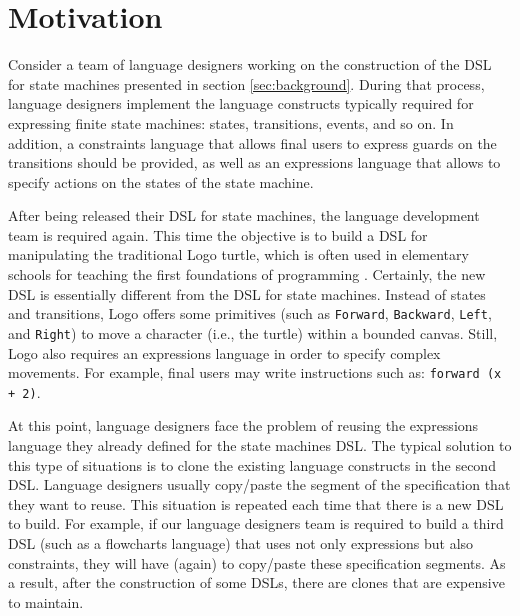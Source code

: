 \section{Motivation}
\label{sec:motivation}

Consider a team of language designers working on the construction of the DSL for state machines presented in section \ref{sec:background}. During that process, language designers implement the language constructs typically required for expressing finite state machines: states, transitions, events, and so on. In addition, a constraints language that allows final users to express guards on the transitions should be provided, as well as an expressions language that allows to specify actions on the states of the state machine. %

After being released their DSL for state machines, the language development team is required again. This time the objective is to build a DSL for manipulating the traditional Logo turtle, which is often used in elementary schools for teaching the first foundations of programming \cite{Olson:1987}. Certainly, the new DSL is essentially different from the DSL for state machines. Instead of states and transitions, Logo offers some primitives (such as \texttt{Forward}, \texttt{Backward}, \texttt{Left}, and \texttt{Right}) to move a character (i.e., the turtle) within a bounded canvas. Still, Logo also requires an expressions language in order to specify complex movements. For example, final users may write instructions such as: \texttt{forward (x + 2)}.

At this point, language designers face the problem of reusing the expressions language they already defined for the state machines DSL. The typical solution to this type of situations is to clone the existing language constructs in the second DSL. Language designers usually copy/paste the segment of the specification that they want to reuse. This situation is repeated each time that there is a new DSL to build. For example, if our language designers team is required to build a third DSL (such as a flowcharts language) that uses not only expressions but also constraints, they will have (again) to copy/paste these specification segments. As a result, after the construction of some DSLs, there are clones that are expensive to maintain.


